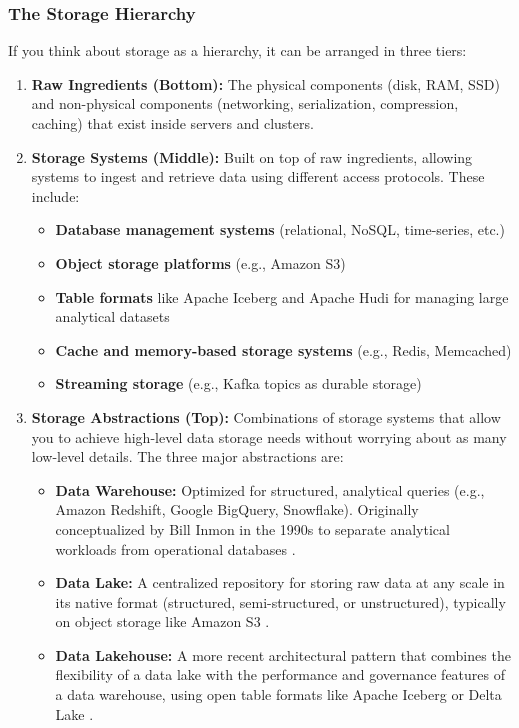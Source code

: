 \documentclass{article}
\begin{document}
\subsubsection{The Storage Hierarchy}
If you think about storage as a hierarchy, it can be arranged in three tiers:
\begin{enumerate}
    \item \textbf{Raw Ingredients (Bottom):} The physical components (disk, RAM, SSD) and non-physical components (networking, serialization, compression, caching) that exist inside servers and clusters.

    \item \textbf{Storage Systems (Middle):} Built on top of raw ingredients, allowing systems to ingest and retrieve data using different access protocols. These include:
    \begin{itemize}
        \item \textbf{Database management systems} (relational, NoSQL, time-series, etc.)
        \item \textbf{Object storage platforms} (e.g., Amazon S3)
        \item \textbf{Table formats} like Apache Iceberg \cite{iceberg2020} and Apache Hudi for managing large analytical datasets
        \item \textbf{Cache and memory-based storage systems} (e.g., Redis, Memcached)
        \item \textbf{Streaming storage} (e.g., Kafka topics as durable storage)
    \end{itemize}

    \item \textbf{Storage Abstractions (Top):} Combinations of storage systems that allow you to achieve high-level data storage needs without worrying about as many low-level details. The three major abstractions are:
    \begin{itemize}
        \item \textbf{Data Warehouse:} Optimized for structured, analytical queries (e.g., Amazon Redshift, Google BigQuery, Snowflake). Originally conceptualized by Bill Inmon in the 1990s to separate analytical workloads from operational databases \cite{inmon2005building}.
        \item \textbf{Data Lake:} A centralized repository for storing raw data at any scale in its native format (structured, semi-structured, or unstructured), typically on object storage like Amazon S3 \cite{reis2022fundamentals}.
        \item \textbf{Data Lakehouse:} A more recent architectural pattern that combines the flexibility of a data lake with the performance and governance features of a data warehouse, using open table formats like Apache Iceberg or Delta Lake \cite{armbrust2021lakehouse}.
    \end{itemize}
\end{enumerate}
\end{document}
